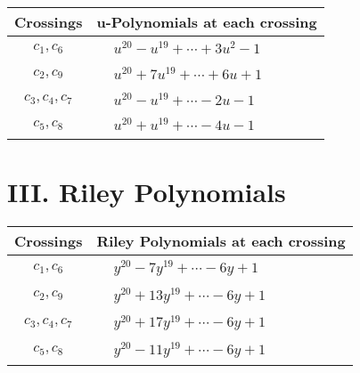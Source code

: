 \documentclass[1p]{elsarticle_modified}
\theoremstyle{definition}
\begin{document}
\begin{tabular}{m{50pt}|m{274pt}}
Crossings & \hspace{64pt}u-Polynomials at each crossing \\
\hline $$\begin{aligned}c_{1},c_{6}\end{aligned}$$&$\begin{aligned}
&u^{20}- u^{19}+\cdots+3 u^2-1
\end{aligned}$\\
\hline $$\begin{aligned}c_{2},c_{9}\end{aligned}$$&$\begin{aligned}
&u^{20}+7 u^{19}+\cdots+6 u+1
\end{aligned}$\\
\hline $$\begin{aligned}c_{3},c_{4},c_{7}\end{aligned}$$&$\begin{aligned}
&u^{20}- u^{19}+\cdots-2 u-1
\end{aligned}$\\
\hline $$\begin{aligned}c_{5},c_{8}\end{aligned}$$&$\begin{aligned}
&u^{20}+u^{19}+\cdots-4 u-1
\end{aligned}$\\
\hline
\end{tabular}\newpage\renewcommand{\arraystretch}{1}
\centering \section*{ III. Riley Polynomials}
\begin{tabular}{m{50pt}|m{274pt}}
Crossings & \hspace{64pt}Riley Polynomials at each crossing \\
\hline $$\begin{aligned}c_{1},c_{6}\end{aligned}$$&$\begin{aligned}
&y^{20}-7 y^{19}+\cdots-6 y+1
\end{aligned}$\\
\hline $$\begin{aligned}c_{2},c_{9}\end{aligned}$$&$\begin{aligned}
&y^{20}+13 y^{19}+\cdots-6 y+1
\end{aligned}$\\
\hline $$\begin{aligned}c_{3},c_{4},c_{7}\end{aligned}$$&$\begin{aligned}
&y^{20}+17 y^{19}+\cdots-6 y+1
\end{aligned}$\\
\hline $$\begin{aligned}c_{5},c_{8}\end{aligned}$$&$\begin{aligned}
&y^{20}-11 y^{19}+\cdots-6 y+1
\end{aligned}$\\
\hline
\end{tabular}
\vskip 2pc
\end{document}
